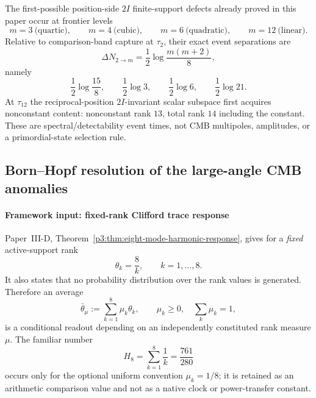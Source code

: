 \documentclass[12pt,a4paper]{article}
\begin{document}
\begin{proposition}
\label{p8:prop:v260-2i-detectability-event-schedule}
The first-possible position-side $2I$ finite-support defects already proved in
this paper occur at frontier levels
\[
 m=3\ \text{(quartic)},\qquad
 m=4\ \text{(cubic)},\qquad
 m=6\ \text{(quadratic)},\qquad
 m=12\ \text{(linear)}.
\]
Relative to comparison-band capture at $\tau_2$, their exact event separations
are
\[
 \boxed{
 \Delta N_{2\to m}
 =\frac12\log\frac{m(m+2)}8,}
\]
namely
\[
 \frac12\log\frac{15}{8},\qquad
 \frac12\log3,\qquad
 \frac12\log6,\qquad
 \frac12\log21.
\]
At $\tau_{12}$ the reciprocal-position $2I$-invariant scalar subspace first
acquires nonconstant content: nonconstant rank $13$, total rank $14$ including
the constant.  These are spectral/detectability event times, not CMB
multipoles, amplitudes, or a primordial-state selection rule.
\end{proposition}




\subsection{Born--Hopf resolution of the large-angle CMB anomalies}
\label{p8:sec:bh-lowell-resolution}

\paragraph{Framework input: fixed-rank Clifford trace response}
\label{p8:subsec:bh-input-lowell}

Paper~III-D, Theorem~\ref{p3:thm:eight-mode-harmonic-response}, gives for a
\emph{fixed} active-support rank
\begin{equation}
\label{p8:eq:bh-theta-k}
\theta_k=\frac8k,\qquad k=1,\ldots,8.
\end{equation}
It also states that no probability distribution over the rank values is
generated.  Therefore an average
\begin{equation}
\label{p8:eq:bh-theta-bar}
\bar\theta_\mu:=\sum_{k=1}^8\mu_k\theta_k,
\qquad \mu_k\ge0,\quad\sum_k\mu_k=1,
\end{equation}
is a conditional readout depending on an independently constituted rank
measure \(\mu\).  The familiar number
\begin{equation}
\label{p8:eq:bh-H8-exact}
H_8=\sum_{k=1}^8\frac1k=\frac{761}{280}
\end{equation}
occurs only for the optional uniform convention \(\mu_k=1/8\); it is retained
as an arithmetic comparison value and not as a native clock or power-transfer
constant.
\end{document}
